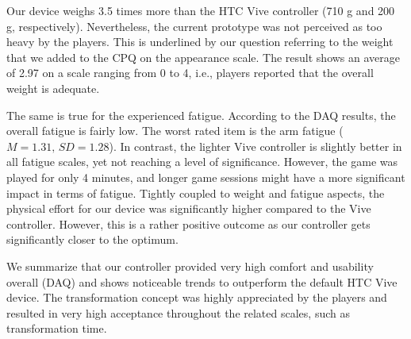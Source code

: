\documentclass{sigchi}
\begin{document}
Our device weighs 3.5 times more than the HTC Vive controller (710 g and 200 g, respectively). Nevertheless, the current prototype was not perceived as too heavy by the players. This is underlined by our question referring to the weight that we added to the CPQ on the appearance scale. The result shows an average of 2.97 on a scale ranging from 0 to 4, i.e., players reported that the overall weight is adequate.

The same is true for the experienced fatigue. According to the DAQ results, the overall fatigue is fairly low. The worst rated item is the arm fatigue ($M = 1.31,\,SD = 1.28$). In contrast, the lighter Vive controller is slightly better in all fatigue scales, yet not reaching a level of significance. However, the game was played for only 4 minutes, and longer game sessions might have a more significant impact in terms of fatigue. Tightly coupled to weight and fatigue aspects, the physical effort for our device was significantly higher compared to the Vive controller. However, this is a rather positive outcome as our controller gets significantly closer to the optimum.

We summarize that our controller provided very high comfort and usability overall (DAQ) and shows noticeable trends to outperform the default HTC Vive device. The transformation concept was highly appreciated by the players and resulted in very high acceptance throughout the related scales, such as transformation time.
\end{document}
